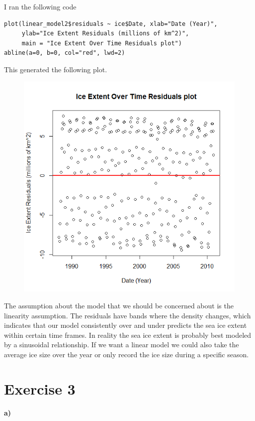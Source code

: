 \documentclass[12pt]{article}
\begin{document}
I ran the following code
\scriptsize
\begin{verbatim}
plot(linear_model2$residuals ~ ice$Date, xlab="Date (Year)",
     ylab="Ice Extent Residuals (millions of km^2)",
     main = "Ice Extent Over Time Residuals plot")
abline(a=0, b=0, col="red", lwd=2)
\end{verbatim}
\normalsize
This generated the following plot.
\begin{figure}[H]
    \begin{center}
        \includegraphics[width=4.5in]{exercise2c.png}
    \end{center}
\end{figure}
The assumption about the model that we should be concerned about is the linearity
assumption. The residuals have bands where the density changes, which indicates
that our model consistently over and under predicts the sea ice extent within certain
time frames. In reality the sea ice extent is probably best modeled by a
sinusoidal relationship. If we want a linear model we could also take the average
ice size over the year or only record the ice size during a specific season.

\section*{Exercise 3}

\paragraph{a)}
\end{document}
